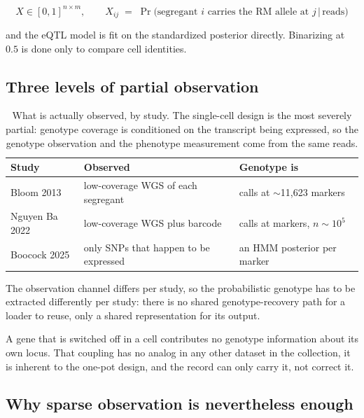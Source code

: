 $$
X \in [0,1]^{n \times m}, \qquad
X_{ij} \;=\; \Pr\!\big(\text{segregant } i \text{ carries the RM allele at } j \,\big|\, \text{reads}\big)
$$

and the eQTL model is fit on the standardized posterior directly. Binarizing at $0.5$ is
done only to compare cell identities.

\subsection{Three levels of partial observation}

\begin{table}[H]\centering
\small
\caption[]{What is actually observed, by study. The single-cell design is the most severely
partial: genotype coverage is conditioned on the transcript being expressed, so the
genotype observation and the phenotype measurement come from the same reads.}
\label{tab:levels}
\begin{tabular}{@{}l l l@{}}
\toprule
Study & Observed & Genotype is \\
\midrule
Bloom 2013 \citep{bloomFindingSourcesMissing2013} & low-coverage WGS of each segregant & calls at $\sim$11,623 markers \\
Nguyen Ba 2022 \citep{nguyenbaBarcodedBulkMapping2022} & low-coverage WGS plus barcode & calls at markers, $n \sim 10^5$ \\
Boocock 2025 \citep{boocockSinglecellEQTLMapping2025} & only SNPs that happen to be expressed & an HMM posterior per marker \\
\bottomrule
\end{tabular}
\end{table}

The observation channel differs per study, so the probabilistic genotype has to be
extracted differently per study: there is no shared genotype-recovery path for a loader
to reuse, only a shared representation for its output.

A gene that is switched off in a cell contributes no genotype information about its own
locus. That coupling has no analog in any other dataset in the collection, it is inherent
to the one-pot design, and the record can only carry it, not correct it.

\subsection{Why sparse observation is nevertheless enough}\label{sec:enough}

